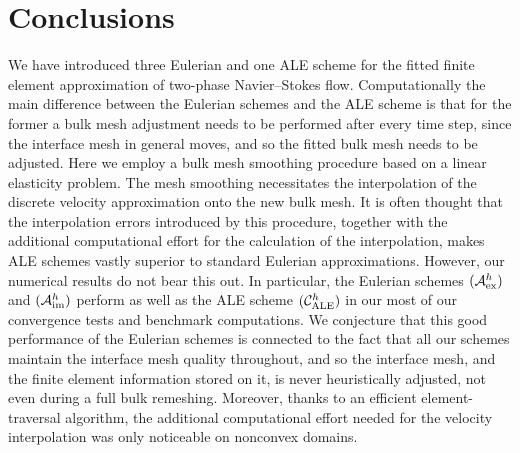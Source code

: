 \documentclass[a4paper,12pt,onecolumn]{article}
\newcommand{\schemeAex}{{\mathcal{A}^h_{\rm ex}}}
\newcommand{\schemeAim}{{\mathcal{A}^h_{\rm im}}}
\newcommand{\schemeALE}{{\mathcal{C}^h_{\rm ALE}}}
\begin{document}
\section*{Conclusions}
We have introduced three Eulerian and one ALE scheme for the fitted finite
element approximation of two-phase Navier--Stokes flow. Computationally the
main difference between the Eulerian schemes and the ALE scheme is that
for the former a bulk mesh adjustment needs to be performed after every time
step, since the interface mesh in general moves, and so the fitted bulk mesh
needs to be adjusted. Here we employ a bulk mesh smoothing procedure based
on a linear elasticity problem. The mesh smoothing necessitates the
interpolation of the discrete velocity approximation onto the new bulk mesh.
It is often thought that the interpolation errors introduced by this procedure,
together with the additional computational effort for the calculation of the
interpolation, makes ALE schemes vastly superior to standard Eulerian
approximations. However, our numerical results do not bear this out.
In particular, the Eulerian schemes $(\schemeAex)$ and $(\schemeAim)$ perform
as well as the ALE scheme $(\schemeALE)$ in our most of our convergence tests
and benchmark computations. We conjecture that this good performance of
the Eulerian schemes is connected to the fact that all our schemes
maintain the interface mesh quality throughout, and so the
interface mesh, and the finite element information stored on it,
is never heuristically adjusted, not even during a full bulk remeshing.
Moreover, thanks to an efficient element-traversal
algorithm, the additional computational effort needed
for the velocity interpolation was only noticeable on nonconvex domains.



\end{document}
